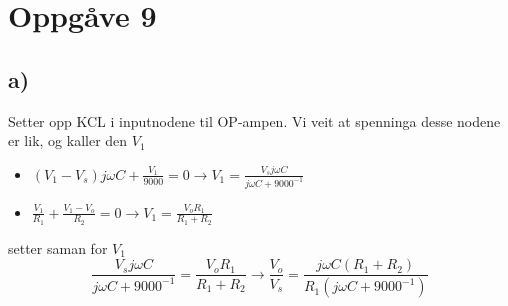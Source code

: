 \documentclass[12pt,a4paper]{article}
\begin{document}
  \section*{Oppgåve 9}
    \subsection*{a)}
    Setter opp KCL i inputnodene til OP-ampen. Vi veit at spenninga desse nodene
    er lik, og kaller den $V_1$
    \begin{itemize}
      \item $(V_1 - V_s)j\omega C + \frac{V_1}{9000} = 0 \rightarrow
        V_1 = \frac{V_sj\omega C}{j\omega C + 9000^{-1}}$
      \item $\frac{V_1}{R_1} + \frac{V_1 - V_o}{R_2} = 0 \rightarrow
        V_1 = \frac{V_oR_1}{R_1 + R_2}$
    \end{itemize}
    setter saman for $V_1$
    \begin{equation}
        \frac{V_sj\omega C}{j\omega C + 9000^{-1}} = \frac{V_oR_1}{R_1 + R_2}
        \rightarrow \frac{V_o}{V_s} = \frac{j\omega C(R_1 + R_2)}{R_1(j\omega C + 9000^{-1})}
    \end{equation}
\end{document}
